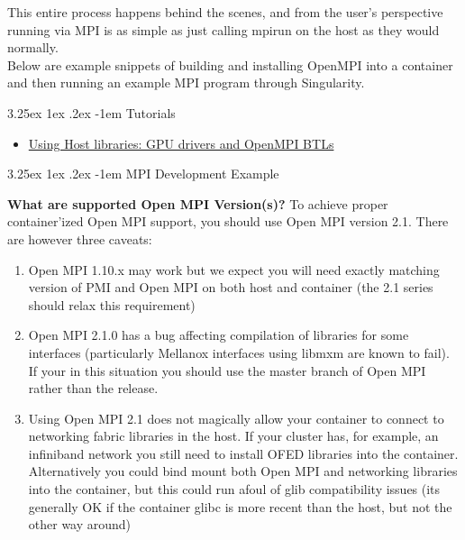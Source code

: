 \documentclass[a4paper]{article}
\makeatletter
\renewcommand\paragraph{\@startsection{paragraph}{5}{\z@}%
  {3.25ex \@plus1ex \@minus.2ex}%
  {-1em}%
  {\normalfont\normalsize\bfseries}}
\makeatother
\begin{document}
This entire process happens behind the scenes, and from the user’s perspective running via MPI is as simple as just calling mpirun on the host as they would normally.\\[0.1in]
Below are example snippets of building and installing OpenMPI into a container and then running an example MPI program through Singularity.


\paragraph{Tutorials}

\begin{itemize}
\item \href{http://singularity.lbl.gov/tutorial-gpu-drivers-open-mpi-mtls}{Using Host libraries: GPU drivers and OpenMPI BTLs
}
\end{itemize}

\paragraph{MPI Development Example}

\textbf{What are supported Open MPI Version(s)?} To achieve proper container’ized Open MPI support, you should use Open MPI version 2.1. There are however three caveats:

\begin{enumerate}
\item Open MPI 1.10.x may work but we expect you will need exactly matching version of PMI and Open MPI on both host and container (the 2.1 series should relax this requirement)
\item Open MPI 2.1.0 has a bug affecting compilation of libraries for some interfaces (particularly Mellanox interfaces using libmxm are known to fail). If your in this situation you should use the master branch of Open MPI rather than the release.
\item Using Open MPI 2.1 does not magically allow your container to connect to networking fabric libraries in the host. If your cluster has, for example, an infiniband network you still need to install OFED libraries into the container. Alternatively you could bind mount both Open MPI and networking libraries into the container, but this could run afoul of glib compatibility issues (its generally OK if the container glibc is more recent than the host, but not the other way around)

\end{enumerate}
\end{document}
